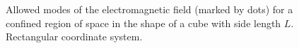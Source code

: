 \begin{figure}
\centering

\caption{Allowed modes of the electromagnetic field (marked by dots) for a confined
  region of space in the shape of a cube with side length $L$. Rectangular
  coordinate system.}
\label{figCh1_pic3}
\end{figure}